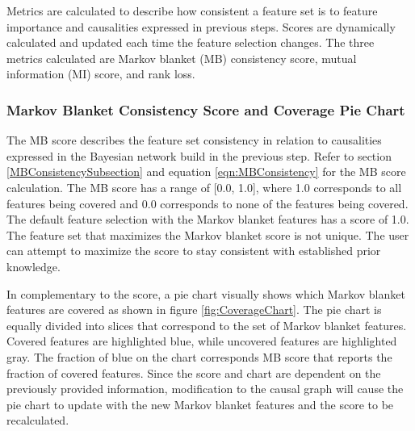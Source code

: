 Metrics are calculated to describe how consistent a feature set is to feature importance and causalities expressed in previous steps. Scores are dynamically calculated and updated each time the feature selection changes. The three metrics calculated are Markov blanket (MB) consistency score, mutual information (MI) score, and rank loss.

\subsubsection{Markov Blanket Consistency Score and Coverage Pie Chart}
The MB score describes the feature set consistency in relation to causalities expressed in the Bayesian network build in the previous step. Refer to section \ref{MBConsistencySubsection} and equation \ref{eqn:MBConsistency} for the MB score calculation. The MB score has a range of [0.0, 1.0], where 1.0 corresponds to all features being covered and 0.0 corresponds to none of the features being covered. The default feature selection with the Markov blanket features has a score of 1.0. The feature set that maximizes the Markov blanket score is not unique. The user can attempt to maximize the score to stay consistent with established prior knowledge.

In complementary to the score, a pie chart visually shows which Markov blanket features are covered as shown in figure \ref{fig:CoverageChart}. The pie chart is equally divided into slices that correspond to the set of Markov blanket features. Covered features are highlighted blue, while uncovered features are highlighted gray. The fraction of blue on the chart corresponds MB score that reports the fraction of covered features. Since the score and chart are dependent on the previously provided information, modification to the causal graph will cause the pie chart to update with the new Markov blanket features and the score to be recalculated.

